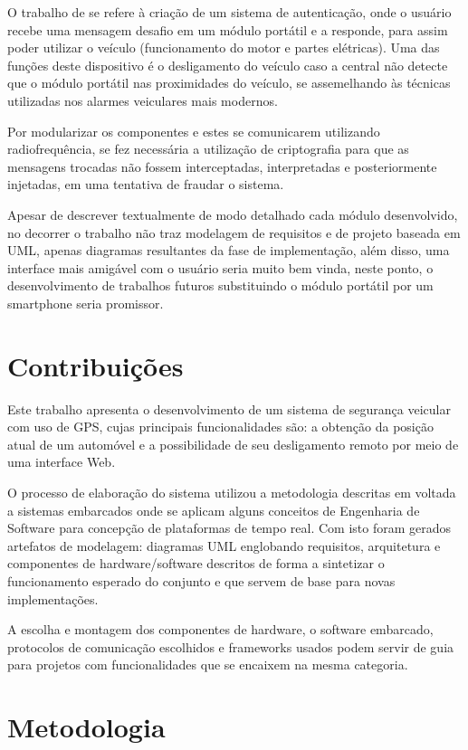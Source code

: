 O trabalho de \textcite{alfonso:2006} se refere à criação de um sistema de autenticação, onde o usuário recebe uma mensagem desafio em um módulo portátil e a responde, para assim poder utilizar o veículo (funcionamento do motor e partes elétricas). Uma das funções deste dispositivo é o desligamento do veículo caso a central não detecte que o módulo portátil nas proximidades do veículo, se assemelhando às técnicas utilizadas nos alarmes veiculares mais modernos.

Por modularizar os componentes e estes se comunicarem utilizando radiofrequência,
se fez necessária a utilização de criptografia para que as mensagens trocadas não 
fossem interceptadas, interpretadas e posteriormente injetadas, em uma tentativa 
de fraudar o sistema. 

Apesar de descrever textualmente de modo detalhado cada módulo desenvolvido, no decorrer o trabalho não traz modelagem de requisitos e de projeto baseada em UML, apenas diagramas resultantes da fase de implementação, além disso, uma interface mais amigável com o usuário seria muito bem vinda, neste ponto, o desenvolvimento de trabalhos futuros substituindo o módulo portátil por um smartphone seria promissor.


\section{Contribui\c{c}\~{o}es}

Este trabalho apresenta o desenvolvimento de um sistema de segurança veicular com uso de GPS, cujas principais funcionalidades são: a obtenção da posição atual de um automóvel e a possibilidade de seu desligamento remoto por meio de uma interface Web.

O processo de elaboração do sistema utilizou a metodologia descritas em \textcite{Wolf:2001} voltada a sistemas embarcados onde se aplicam alguns conceitos de Engenharia de Software para concepção de plataformas de tempo real. Com isto foram gerados artefatos de modelagem: diagramas UML englobando requisitos, arquitetura e componentes de hardware/software descritos de forma a sintetizar o funcionamento esperado do conjunto e que servem de base para novas implementações.

A escolha e montagem dos componentes de hardware, o software embarcado, protocolos de comunicação escolhidos e frameworks usados podem servir de guia para projetos com funcionalidades que se encaixem na mesma categoria.  

\section{Metodologia}

